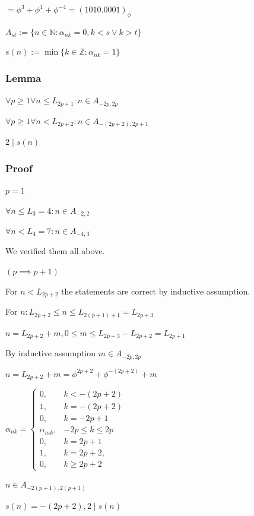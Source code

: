 \documentclass{article}
\begin{document}
\( = \phi^{3} + \phi^{1} + \phi^{-4} = {(1010.0001)}_\phi \)

\( A_{st} := \{ n \in \mathbb{N}: \alpha_{nk} = 0, k < s \lor k > t \} \)

\( s(n) := \min \{ k \in \mathbb{Z} : \alpha_{nk} = 1 \} \)

\subsubsection*{Lemma}

\( \forall p \geq 1 \forall n \leq L_{2p+1}: n \in A_{-2p,2p} \)

\( \forall p \geq 1 \forall n < L_{2p+2}: n \in A_{-(2p+2),2p+1} \)

\( 2 \mid s(n) \)

\subsubsection*{Proof}

\( p = 1 \)

\( \forall n \leq L_{3} = 4: n \in A_{-2,2} \)

\( \forall n < L_{4} = 7: n \in A_{-4,3} \)

We verified them all above.

\( (p \implies p + 1) \)

For \( n < L_{2p+2} \) the statements are correct by inductive assumption.

For \( n: L_{2p+2} \leq n \leq L_{2(p+1) + 1} = L_{2p+3} \)

\( n = L_{2p+2} + m, 0 \leq m \leq L_{2p+3} - L_{2p+2} = L_{2p+1} \)

By inductive assumption \( m \in A_{-2p,2p} \)

\( n = L_{2p+2} + m = \phi^{2p+2} + \phi^{-(2p+2)} + m \)

\( \alpha_{nk} = \left\{\begin{array}{ll} 0, & k < -(2p+2)\\1, & k = -(2p+2)\\0, & k = -2p+1\\\alpha_{mk}, & -2p \leq k \leq 2p \\ 0, & k = 2p + 1\\ 1, & k = 2p+2, \\ 0, & k \geq 2p + 2 \end{array}\right. \)

\( n \in A_{-2(p+1),2(p+1)} \)

\( s(n) = -(2p+2), 2 \mid s(n) \)
\end{document}
